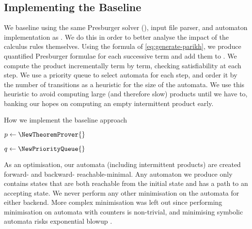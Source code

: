 \subsection{Implementing the Baseline}\label{sec:implementing-baseline}

We baseline using the same Presburger solver (\Princess{}), input file parser,
and automaton implementation as \Catra. We do this in order to better analyse
the impact of the calculus rules themselves. Using the formula of
\eqref{eq:generate-parikh}, we produce quantified Presburger formulae for each
successive term and add them to \Princess. We compute the product incrementally
term by term, checking satisfiability at each step. We use a priority queue to
select automata for each step, and order it by the number of transitions as a
heuristic for the size of the automata. We use this heuristic to avoid computing
large (and therefore slow) products until we have to, banking our hopes on
computing an empty intermittent product early.

\begin{algorithm}
  \caption{How we implement the baseline approach}\label{alg:baseline}

  $p \gets \NewTheoremProver{}$



  $q \gets \NewPriorityQueue{}$


  

  \end{algorithm}

As an optimisation, our automata (including intermittent products) are created
forward- and backward- reachable-minimal. Any automaton we produce only contains
states that are both reachable from the initial state and has a path to an
accepting state. We never perform any other minimisation on the automata for
either backend. More complex minimisation was left out since performing
minimisation on automata with counters is non-trivial, and minimising symbolic
automata risks exponential blowup \cite{minimising-symbolic}.

